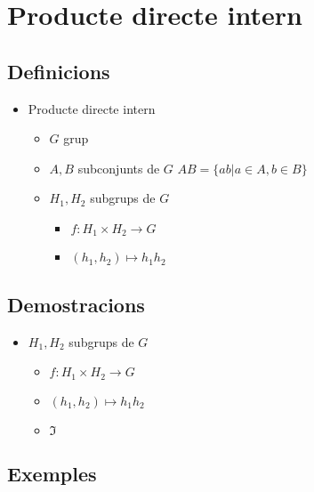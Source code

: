 \section{Producte directe intern}
\subsection*{Definicions}
\begin{itemize}
\item Producte directe intern
	\begin{itemize}
	\item $G$ grup
	\item $A, B$ subconjunts de $G$
		\subitem $AB = \{ab | a \in A, b \in B\}$
	\item $H_1, H_2$ subgrups de $G$
		\begin{itemize}
		\item $f: H_1 \times H_2 \to G$
		\item $(h_1, h_2) \mapsto h_1h_2$
		\end{itemize}
	\end{itemize}
\end{itemize}
\subsection*{Demostracions}
\begin{itemize}
\item $H_1, H_2$ subgrups de $G$
	\begin{itemize}
	\item $f: H_1 \times H_2 \to G$
	\item $(h_1, h_2) \mapsto h_1h_2$
	\item $\Im$
	\end{itemize}
\end{itemize}
\subsection*{Exemples}
